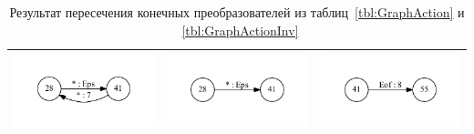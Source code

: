 \begin{table}[h]
\begin{tabular}{ | c | c | c |}
    \\ \hline
    \begin{minipage}{.3\textwidth}
      \includegraphics[width=\linewidth]{Polubelova/28_int}
    \end{minipage}
    &
    \begin{minipage}{.3\textwidth}
      \includegraphics[width=\linewidth]{Polubelova/28_1_int}   
    \end{minipage}
    & 
    \begin{minipage}{.3\textwidth}
      \includegraphics[width=\linewidth]{Polubelova/41_int}
    \end{minipage}
    \\ \hline
  \end{tabular}
  \caption{Результат пересечения конечных преобразователей из таблиц~\ref{tbl:GraphAction} и ~\ref{tbl:GraphActionInv}}
  \label{tbl:GraphActionInters}
\end{table}


